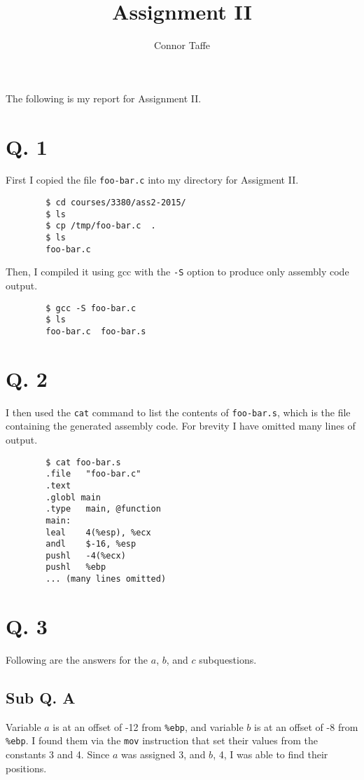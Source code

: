 \documentclass[letterpaper, 10pt]{article}
\title{Assignment II}
\author{Connor Taffe}
\begin{document}
	\maketitle

	The following is my report for Assignment II.

	\section*{Q. 1}

	First I copied the file {\tt foo-bar.c} into my directory for Assigment II.

	\begin{verbatim}
		$ cd courses/3380/ass2-2015/
		$ ls
		$ cp /tmp/foo-bar.c  .
		$ ls
		foo-bar.c
	\end{verbatim}

	Then, I compiled it using gcc with the {\tt -S} option to produce only assembly code output.

	\begin{verbatim}
		$ gcc -S foo-bar.c
		$ ls
		foo-bar.c  foo-bar.s
	\end{verbatim}

	\section*{Q. 2}

	I then used the {\tt cat} command to list the contents of {\tt foo-bar.s}, which is the file containing the generated assembly code. For brevity I have omitted many lines of output.

	\begin{verbatim}
		$ cat foo-bar.s
		.file	"foo-bar.c"
		.text
		.globl main
		.type	main, @function
		main:
		leal	4(%esp), %ecx
		andl	$-16, %esp
		pushl	-4(%ecx)
		pushl	%ebp
		... (many lines omitted)
	\end{verbatim}

	\section*{Q. 3}

	Following are the answers for the $a$, $b$, and $c$ subquestions.

	\subsection*{Sub Q. A}

		Variable $a$ is at an offset of -12 from {\tt \%ebp}, and variable $b$ is at an offset of -8 from {\tt \%ebp}. I found them via the {\tt mov} instruction that set their values from the constants 3 and 4. Since $a$ was assigned 3, and $b$, 4, I was able to find their positions.
\end{document}
